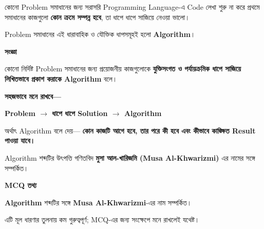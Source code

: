 
কোনো Problem সমাধানের জন্য সরাসরি Programming Language-এ
Code লেখা শুরু না করে প্রথমে সমাধানের কাজগুলো
\textbf{কোন ক্রমে সম্পন্ন হবে}, তা ধাপে ধাপে সাজিয়ে নেওয়া ভালো।

Problem সমাধানের এই ধারাবাহিক ও যৌক্তিক ধাপসমূহই হলো
\textbf{Algorithm}।


\begin{definitionbox}

\textbf{\color{darkTeal}সংজ্ঞা}

কোনো নির্দিষ্ট Problem সমাধানের জন্য প্রয়োজনীয় কাজগুলোকে
\textbf{যুক্তিসংগত ও পর্যায়ক্রমিক ধাপে সাজিয়ে লিখিতভাবে প্রকাশ
করাকে Algorithm} বলে।

\end{definitionbox}

\textbf{সহজভাবে মনে রাখবে—}

\begin{center}

\textbf{
Problem
\(\longrightarrow\)
ধাপে ধাপে Solution
\(\longrightarrow\)
Algorithm
}

\end{center}

অর্থাৎ Algorithm বলে দেয়—
\textbf{কোন কাজটি আগে হবে, তার পরে কী হবে এবং কীভাবে কাঙ্ক্ষিত
Result পাওয়া যাবে।}


Algorithm শব্দটির উৎপত্তি গণিতবিদ
\textbf{মুসা আল-খারিজমি (Musa Al-Khwarizmi)}
এর নামের সঙ্গে সম্পর্কিত।

\begin{rememberbox}

\textbf{\color{deepOrange}MCQ তথ্য}

\textbf{Algorithm} শব্দটির সঙ্গে
\textbf{Musa Al-Khwarizmi}-এর নাম সম্পর্কিত।

এটি মূল ধারণার তুলনায় কম গুরুত্বপূর্ণ;
MCQ-এর জন্য সংক্ষেপে মনে রাখলেই যথেষ্ট।

\end{rememberbox}


